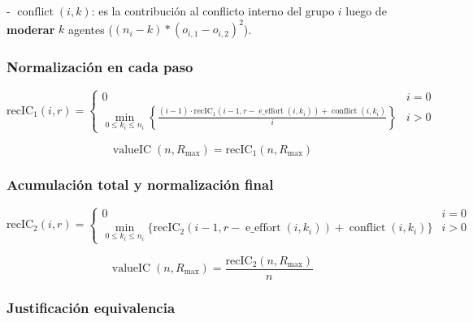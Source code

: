 - $\operatorname{ conflict }(i,k)$: es la contribución al conflicto interno del grupo $i$ luego de \textbf{moderar} $k$ agentes ($(n_i - k) * (o_{ i,1 } - o_{ i,2 })^2$).

\subsubsection{Normalización en cada paso}

\begin{equation}
	\operatorname{ { recIC }_1 }(i,r) = \begin{cases}
		0                                                                                                                                                                                        & i = 0 \\
		\min_{ 0 \leq k_i \leq n_i } \left \{ \frac{ (i - 1) \cdot \operatorname{ { recIC }_1 }(i - 1,r - \operatorname{ e\_effort }(i,k_i)) + \operatorname{ conflict }(i,k_i) }{ i } \right \} & i > 0
	\end{cases}
\end{equation}

\begin{equation}
	\operatorname{ valueIC }(n,R_{ \max }) = \operatorname{ { recIC }_1 }(n,R_{ \max })
\end{equation}

\subsubsection{Acumulación total y normalización final}

\begin{equation}
	\operatorname{ { recIC }_2 }(i,r) = \begin{cases}
		0                                                                                                                                             & i = 0 \\
		\min_{ 0 \leq k_i \leq n_i } \{\operatorname{ { recIC }_2 }(i - 1,r - \operatorname{ e\_effort }(i,k_i)) + \operatorname{ conflict }(i,k_i)\} & i > 0
	\end{cases}
\end{equation}

\begin{equation}
	\operatorname{ valueIC }(n,R_{ \max }) = \frac{ \operatorname{ { recIC }_2 }(n,R_{ \max }) }{ n }
\end{equation}

\subsubsection{Justificación equivalencia}

